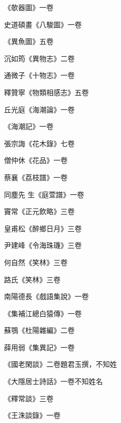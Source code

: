 \begin{pinyinscope}
 《欹器圖》一卷



 史道碩畫《八駿圖》一卷



 《異魚圖》五卷



 沉如筠《異物志》二卷



 通微子《十物志》一卷



 釋贊寧《物類相感志》五卷



 丘光庭《海潮論》一卷



 《海潮記》一卷



 張宗誨《花木錄》七卷



 僧仲休《花品》一卷



 蔡襄《荔枝譜》一卷



 同塵先
 生《庭萱譜》一卷



 竇常《正元飲略》三卷



 皇甫松《醉鄉日月》三卷



 尹建峰《令海珠璣》三卷



 何自然《笑林》三卷



 路氏《笑林》三卷



 南陽德長《戲語集說》一卷



 《集補江總白猿傳》一卷



 蘇鶚《杜陽雜編》二卷



 薛用弱《集異記》一卷



 《國老閑談》二卷題君玉撰，不知姓



 《大隱居士詩話》一卷不知姓名



 《釋常談》三卷



 《王洙談錄》一卷




\end{pinyinscope}
